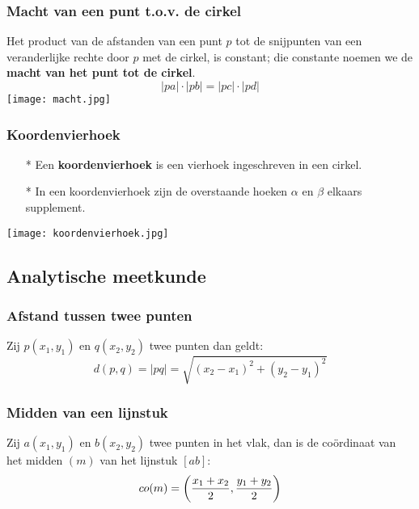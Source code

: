 \subsubsection{Macht van een punt t.o.v. de cirkel} \label{macht_punt-cirkel}
\hypertarget{macht_punt-cirkel}{}
	Het product van de afstanden van een punt $p$ tot de snijpunten van een veranderlijke 	rechte door $p$ met de cirkel, is constant; die constante noemen we de {\bf macht van 	het punt tot de cirkel}.
	\[|pa|\cdot|pb|=|pc|\cdot|pd|\]
        \texttt{[image: macht.jpg]}

\subsubsection{Koordenvierhoek} \label{koordenvierhoek}
\hypertarget{koordenvierhoek}{}
	\begin{itemize}
	\item[*]Een {\bf koordenvierhoek} is een vierhoek ingeschreven in een cirkel.
	\item[*]In een koordenvierhoek zijn de overstaande hoeken $\alpha$ en $\beta$ elkaars 	supplement.
	\end{itemize}
        \texttt{[image: koordenvierhoek.jpg]}

\subsection{Analytische meetkunde} \label{analytische_meetkunde}
\hypertarget{analytische_meetkunde}{}

\subsubsection{Afstand tussen twee punten} \label{afstand_twee_punten}
\hypertarget{afstand_twee_punten}{}
Zij $p(x_1, y_1)$ en $q(x_2, y_2)$ twee punten dan geldt:\newline
\[d(p, q)=|pq|=\sqrt{(x_2-x_1)^2+(y_2-y_1)^2}\]

\subsubsection{Midden van een lijnstuk} \label{midden_lijnstuk}
\hypertarget{midden_lijnstuk}{}
Zij $a(x_1, y_1)$ en $b(x_2, y_2)$ twee punten in het vlak, dan is de co\"ordinaat van het midden $(m)$ van het lijnstuk $[ab]$:
\[co(m)=\left(\displaystyle\frac{\displaystyle x_1+x_2}{\displaystyle 2}, \displaystyle\frac{\displaystyle y_1+y_2}{\displaystyle 2}\right)\]


